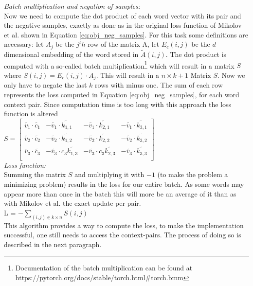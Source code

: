 \textit{Batch multiplication and negation of samples:}\\
Now we need to compute the dot product of each word vector with its pair and the negative samples, exactly as done as in the original loss function of Mikolov et al. shown in Equation \ref{eq:obj_neg_samples}. For this task some definitions are necessary: let $A_j$ be the $j^th$ row of the matrix A, let $E_c(i,j)$ be the $d$ dimensional embedding of the word stored in $\tilde{A}(i,j)$. The dot product is computed with a so-called batch multiplication\footnote{Documentation of the batch multiplication can be found at https://pytorch.org/docs/stable/torch.html\#torch.bmm} which will result in a matrix $S$ where $S(i,j) = E_c(i,j) \cdot A_j$. This will result in a $n\times k+1$ Matrix $S$. Now we only have to negate the last $k$ rows with minus one. The sum of each row represents the loss computed in Equation \ref{eq:obj_neg_samples}, for each word context pair.
Since computation time is too long with this approach the loss function is altered\\
$S = \begin{bmatrix}
\tilde{v_1} \cdot \tilde{c_1} & -\tilde{v_1} \cdot \tilde{k_{1,1}} & -\tilde{v_1} \cdot \tilde{k_{2,1}}& -\tilde{v_1} \cdot \tilde{k_{3,1}}\\
\tilde{v_2} \cdot \tilde{c_2} & -\tilde{v_2} \cdot \tilde{k_{1,2}} & -\tilde{v_2} \cdot \tilde{k_{2,2}} & -\tilde{v_2} \cdot \tilde{k_{3,2}}\\
\tilde{v_3} \cdot \tilde{c_3} &-\tilde{v_3} \cdot c_3 \tilde{k_{1,3}} & -\tilde{v_3} \cdot c_3 \tilde{k_{2,3}}&-\tilde{v_3} \cdot \tilde{k_{3,3}}\\
\end{bmatrix}$\\

\textit{Loss function:}\\
Summing the matrix $S$ and multiplying it with $-1$ (to make the problem a minimizing problem) results in the loss for our entire batch. As some words may appear more than once in the batch this will more be an average of it than as with Mikolov et al. \cite{mikolov2} the exact update per pair. \\
L = $- \sum_{(i,j) \in k \times n} S(i,j) $\\

This algorithm provides a way to compute the loss, to make the implementation successful, one still needs to access the context-pairs. The process of doing so is described in the next paragraph.

